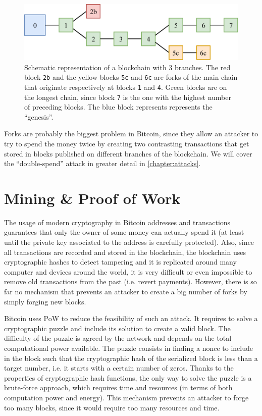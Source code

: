 \begin{figure}[h]
	\centering
	\vspace*{0.25cm}
	\includegraphics[scale=0.9]{figures/forks}
	\vspace*{0.25cm}
	\caption[Schematic representation of a blockchain with \num{3} branches.]{
		Schematic representation of a blockchain with \num{3} branches.
		The red block \texttt{2b} and the yellow blocks \texttt{5c} and \texttt{6c} are forks of the main chain that originate respectively at blocks \texttt{1} and \texttt{4}.
		Green blocks are on the longest chain, since block \texttt{7} is the one with the highest number of preceding blocks.
		The blue block represents represents the ``genesis''.
	}
	\label{fig:forks}
\end{figure}

Forks are probably the biggest problem in Bitcoin, since they allow an attacker to try to spend the money twice by creating two contrasting transactions that get stored in blocks published on different branches of the blockchain.
We will cover the ``double-spend'' attack in greater detail in \cref{chapter:attacks}.

\section{Mining \& Proof of Work}
\label{sec:mining}
The usage of modern cryptography in Bitcoin addresses and transactions guarantees that only the owner of some money can actually spend it (at least until the private key associated to the address is carefully protected).
Also, since all transactions are recorded and stored in the blockchain, the blockchain uses cryptographic hashes to detect tampering and it is replicated around many computer and devices around the world, it is very difficult or even impossible to remove old transactions from the past (i.e. revert payments).
However, there is so far no mechanism that prevents an attacker to create a big number of forks by simply forging new blocks.

\bigskip
Bitcoin uses \ac{PoW} \cite{pow_2002} to reduce the feasibility of such an attack.
It requires to solve a cryptographic puzzle and include its solution to create a valid block.
The difficulty of the puzzle is agreed by the network and depends on the total computational power available.
The puzzle consists in finding a nonce to include in the block such that the cryptographic hash of the serialized block is less than a target number, i.e. it starts with a certain number of zeros.
Thanks to the properties of cryptographic hash functions, the only way to solve the puzzle is a brute-force approach, which requires time and resources (in terms of both computation power and energy).
This mechanism prevents an attacker to forge too many blocks, since it would require too many resources and time.

